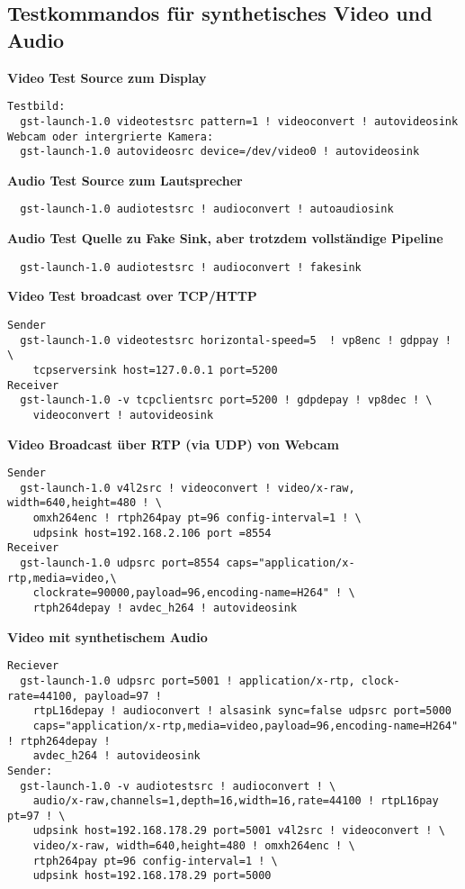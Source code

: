 \subsection{Testkommandos für synthetisches Video und Audio}

\textbf{Video Test Source zum Display}
\begin{verbatim}
Testbild:
  gst-launch-1.0 videotestsrc pattern=1 ! videoconvert ! autovideosink
Webcam oder intergrierte Kamera: 
  gst-launch-1.0 autovideosrc device=/dev/video0 ! autovideosink
\end{verbatim}

\textbf{Audio Test Source zum Lautsprecher}
\begin{verbatim}
  gst-launch-1.0 audiotestsrc ! audioconvert ! autoaudiosink
\end{verbatim}

\textbf{Audio Test Quelle zu Fake Sink, aber trotzdem vollständige Pipeline}
\begin{verbatim}
  gst-launch-1.0 audiotestsrc ! audioconvert ! fakesink
\end{verbatim}

\textbf{Video Test broadcast over TCP/HTTP}
\begin{verbatim}
Sender
  gst-launch-1.0 videotestsrc horizontal-speed=5  ! vp8enc ! gdppay ! \
    tcpserversink host=127.0.0.1 port=5200
Receiver
  gst-launch-1.0 -v tcpclientsrc port=5200 ! gdpdepay ! vp8dec ! \
    videoconvert ! autovideosink
\end{verbatim}

\textbf{Video Broadcast über RTP (via UDP) von Webcam}
\begin{verbatim}
Sender
  gst-launch-1.0 v4l2src ! videoconvert ! video/x-raw, width=640,height=480 ! \
    omxh264enc ! rtph264pay pt=96 config-interval=1 ! \
    udpsink host=192.168.2.106 port =8554
Receiver
  gst-launch-1.0 udpsrc port=8554 caps="application/x-rtp,media=video,\
    clockrate=90000,payload=96,encoding-name=H264" ! \
    rtph264depay ! avdec_h264 ! autovideosink
\end{verbatim}

\textbf{Video mit synthetischem Audio}
\begin{verbatim}
Reciever
  gst-launch-1.0 udpsrc port=5001 ! application/x-rtp, clock-rate=44100, payload=97 ! 
    rtpL16depay ! audioconvert ! alsasink sync=false udpsrc port=5000 
    caps="application/x-rtp,media=video,payload=96,encoding-name=H264" ! rtph264depay !     
    avdec_h264 ! autovideosink
Sender:
  gst-launch-1.0 -v audiotestsrc ! audioconvert ! \
    audio/x-raw,channels=1,depth=16,width=16,rate=44100 ! rtpL16pay pt=97 ! \
    udpsink host=192.168.178.29 port=5001 v4l2src ! videoconvert ! \
    video/x-raw, width=640,height=480 ! omxh264enc ! \
    rtph264pay pt=96 config-interval=1 ! \
    udpsink host=192.168.178.29 port=5000
\end{verbatim}

